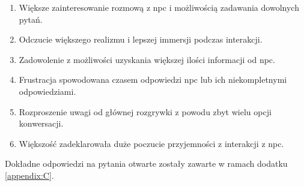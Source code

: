 \begin{enumerate}
    \item Większe zainteresowanie rozmową z \gls{npc} i możliwością zadawania dowolnych pytań.
    \item Odczucie większego realizmu i lepszej immersji podczas interakcji.
    \item Zadowolenie z możliwości uzyskania większej ilości informacji od \gls{npc}.
    \item Frustracja spowodowana czasem odpowiedzi \gls{npc} lub ich niekompletnymi odpowiedziami.
    \item Rozproszenie uwagi od głównej rozgrywki z powodu zbyt wielu opcji konwersacji.
    \item Większość zadeklarowała duże poczucie przyjemności z interakcji z \gls{npc}.
\end{enumerate}

Dokładne odpowiedzi na pytania otwarte zostały zawarte w ramach dodatku \ref{appendix:C}.